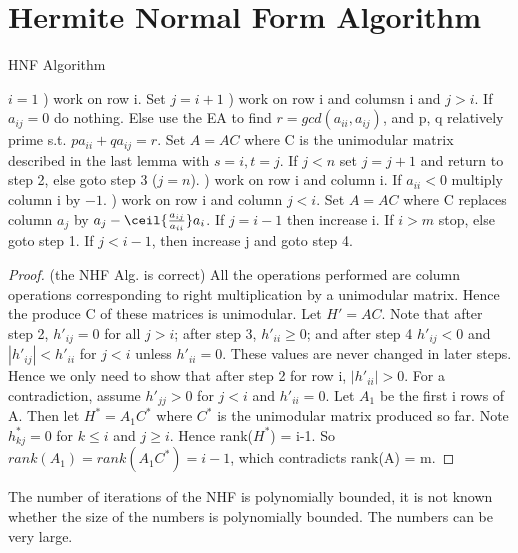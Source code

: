 \section{Hermite Normal Form Algorithm}



\begin{algorithm}                      
\caption{HNF Algorithm}
\label{alg:HNFAlgorithm}
\begin{algorithmic}                    
\STATE $i = 1$
) work on row i. Set $j = i+1$
) work on row i and columsn i and $j > i$. If $a_{ij} = 0$ do nothing. Else use the EA to find $r = gcd(a_{ii}, a_{ij})$, and p, q relatively prime s.t. $pa_{ii}+ qa_{ij} = r$. Set $A = AC$ where C is the unimodular matrix described in the last lemma with $s = i, t=j$. If $j < n$ set $j = j+1$ and return to step 2, else goto step 3 ($j=n$).
) work on row i and column i. If $a_{ii} < 0$ multiply column i by $-1$.
) work on row i and column $j < i$. Set $A = AC$ where C replaces column $a_j$ by $a_j - \ceil{\frac{a_{ij}}{a_{ii}}}a_i$. If $j = i-1$ then increase i. If $i > m$ stop, else goto step 1. If $j < i-1$, then increase j and goto step 4.
\end{algorithmic}
\end{algorithm}


\begin{proof}(the NHF Alg. is correct)
All the operations performed are column operations corresponding to right multiplication by a unimodular matrix. Hence the produce C of these matrices is unimodular. Let $H' =AC$. Note that after step 2, $h'_{ij} = 0$ for all $j > i$; after step 3, $h'_{ii} \geq 0$; and after step 4 $h'_{ij} < 0$ and $|h'_{ij}| < h'_{ii}$ for $j < i$ unless $h'_{ii} = 0$. These values are never changed in later steps. Hence we only need to show that after step 2 for row i, $|h'_{ii}| > 0$.
For a contradiction, assume $h'_{jj} > 0$ for $j < i$ and $h'_{ii} = 0$. Let $A_1$ be the first i rows of A. Then let $H^* = A_1 C^*$ where $C^*$ is the unimodular matrix produced so far. Note $h^*_{kj} = 0$ for $k \leq i$ and $j \geq i$. Hence rank($H^*$) = i-1. So $rank(A_1) = rank(A_1C^*) = i-1$, which contradicts rank(A) = m.
\end{proof}

The number of iterations of the NHF is polynomially bounded, it is not known whether the size of the numbers is polynomially bounded. The numbers can be very large.

